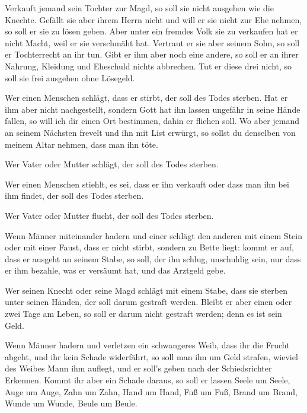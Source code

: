  Verkauft jemand sein Tochter zur Magd, so soll sie nicht
ausgehen wie die Knechte.  Gefällt sie aber ihrem Herrn
nicht und will er sie nicht zur Ehe nehmen, so soll er sie zu lösen
geben. Aber unter ein fremdes Volk sie zu verkaufen hat er nicht Macht,
weil er sie verschmäht hat.  Vertraut er sie aber seinem
Sohn, so soll er Tochterrecht an ihr tun.  Gibt er ihm aber
noch eine andere, so soll er an ihrer Nahrung, Kleidung und Eheschuld
nichts abbrechen.  Tut er diese drei nicht, so soll sie
frei ausgehen ohne Lösegeld.

 Wer einen Menschen schlägt, dass er stirbt, der soll des
Todes sterben.  Hat er ihm aber nicht nachgestellt, sondern
Gott hat ihn lassen ungefähr in seine Hände fallen, so will ich dir
einen Ort bestimmen, dahin er fliehen soll.  Wo aber jemand
an seinem Nächsten frevelt und ihn mit List erwürgt, so sollst du
denselben von meinem Altar nehmen, dass man ihn töte.

 Wer Vater oder Mutter schlägt, der soll des Todes sterben.

 Wer einen Menschen stiehlt, es sei, dass er ihn verkauft
oder dass man ihn bei ihm findet, der soll des Todes sterben.

 Wer Vater oder Mutter flucht, der soll des Todes sterben.

 Wenn Männer miteinander hadern und einer schlägt den
anderen mit einem Stein oder mit einer Faust, dass er nicht stirbt,
sondern zu Bette liegt:  kommt er auf, dass er ausgeht an
seinem Stabe, so soll, der ihn schlug, unschuldig sein, nur dass er ihm
bezahle, was er versäumt hat, und das Arztgeld gebe.

 Wer seinen Knecht oder seine Magd schlägt mit einem Stabe,
dass sie sterben unter seinen Händen, der soll darum gestraft werden.
 Bleibt er aber einen oder zwei Tage am Leben, so soll er
darum nicht gestraft werden; denn es ist sein Geld.

 Wenn Männer hadern und verletzen ein schwangeres Weib,
dass ihr die Frucht abgeht, und ihr kein Schade widerfährt, so soll man
ihn um Geld strafen, wieviel des Weibes Mann ihm auflegt, und er soll's
geben nach der Schiedsrichter Erkennen.  Kommt ihr aber ein
Schade daraus, so soll er lassen Seele um Seele,  Auge um
Auge, Zahn um Zahn, Hand um Hand, Fuß um Fuß,  Brand um
Brand, Wunde um Wunde, Beule um Beule.

